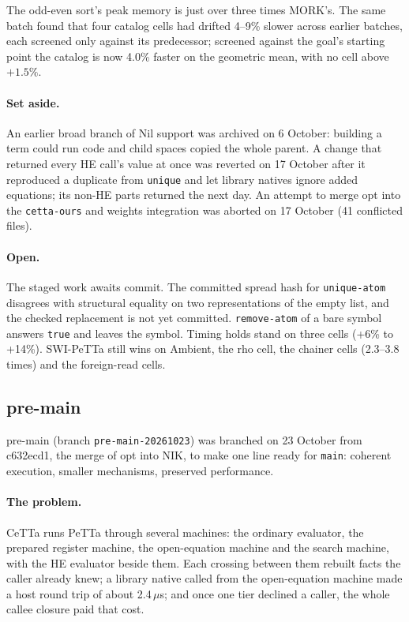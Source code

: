 \documentclass[11pt]{article}
\newcommand{\code}[1]{\texttt{#1}}
\newcommand{\PeTTa}{\textup{PeTTa}}
\newcommand{\HE}{\textup{HE}}
\newcommand{\CeTTa}{\textup{CeTTa}}
\begin{document}
\noindent
The odd-even sort's peak memory is just over three times MORK's.  The same
batch found that four catalog cells had drifted 4--9\% slower across earlier
batches, each screened only against its predecessor; screened against the
goal's starting point the catalog is now 4.0\% faster on the geometric mean,
with no cell above $+1.5\%$.

\paragraph{Set aside.}  An earlier broad branch of Nil support was archived on
6 October: building a term could run code and child spaces copied the whole
parent.  A change that returned every \HE{} call's value at once was reverted
on 17 October after it reproduced a duplicate from \code{unique} and let
library natives ignore added equations; its non-\HE{} parts returned the next
day.  An attempt to merge opt into the \code{cetta-ours} and weights
integration was aborted on 17 October (41 conflicted files).

\paragraph{Open.}  The staged work awaits commit.  The committed spread hash
for \code{unique-atom} disagrees with structural equality on two
representations of the empty list, and the checked replacement is not yet
committed.  \code{remove-atom} of a bare symbol answers \code{true} and leaves
the symbol.  Timing holds stand on three cells (+6\% to +14\%).
SWI-\PeTTa{} still wins on Ambient, the rho cell, the chainer cells (2.3--3.8
times) and the foreign-read cells.

\subsection{pre-main}
\label{sec:line-premain}

pre-main (branch \code{pre-main-20261023}) was branched on 23 October from
c632ecd1, the merge of opt into NIK, to make one line ready for \code{main}:
coherent execution, smaller mechanisms, preserved performance.

\paragraph{The problem.}  \CeTTa{} runs \PeTTa{} through several machines:
the ordinary evaluator, the prepared register machine, the open-equation
machine and the search machine, with the \HE{} evaluator beside them.  Each
crossing between them rebuilt facts the caller already knew; a library native
called from the open-equation machine made a host round trip of about
2.4\,$\mu$s; and once one tier declined a caller, the whole callee closure
paid that cost.
\end{document}

